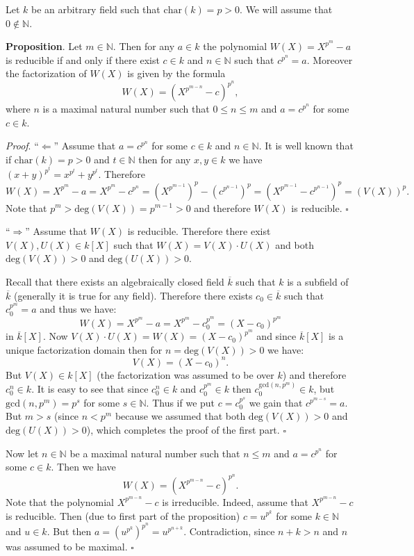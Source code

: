 \documentclass[12pt]{article}
\begin{document}
Let $k$ be an arbitrary field such that $\mathrm{char}(k) = p> 0$. We will assume that $0\not\in\mathbb{N}$.

\textbf{Proposition}. Let $m\in\mathbb{N}$. Then for any $a\in k$ the polynomial $W(X)=X^{p^{m}}-a$ is reducible if and only if there exist $c\in k$ and $n\in\mathbb{N}$ such that $c^{p^{n}}=a$. Moreover the factorization of $W(X)$ is given by the formula
$$W(X)=(X^{p^{m-n}}-c)^{p^n},$$
where $n$ is a maximal natural number such that $0\leq n\leq m$ and $a=c^{p^n}$ for some $c\in k$.

\textit{Proof}. ``$\Leftarrow$'' Assume that $a=c^{p^{n}}$ for some $c\in k$ and $n\in\mathbb{N}$. It is well known that if $\mathrm{char}(k) = p> 0$ and $t\in\mathbb{N}$ then for any $x,y\in k$ we have $(x+y)^{p^t}=x^{p^t}+y^{p^t}$. Therefore
$$W(X)=X^{p^{m}}-a=X^{p^{m}}-c^{p^{n}}=(X^{p^{m-1}})^p-(c^{p^{n-1}})^p=(X^{p^{m-1}}-c^{p^{n-1}})^p=(V(X))^p.$$
Note that $p^m > \mathrm{deg}(V(X))=p^{m-1} > 0$ and therefore $W(X)$ is reducible. $\square$

``$\Rightarrow$'' Assume that $W(X)$ is reducible. Therefore there exist $V(X),U(X)\in k[X]$ such that $W(X)=V(X)\cdot U(X)$ and both $\mathrm{deg}(V(X))>0$ and $\mathrm{deg}(U(X))>0$.

Recall that there exists an algebraically closed field $\overline{k}$ such that $k$ is a subfield of $\overline{k}$ (generally it is true for any field). Therefore there exists $c_{0}\in\overline{k}$ such that $c_{0}^{p^m}=a$ and thus we have:
$$W(X)=X^{p^{m}}-a=X^{p^{m}}-c_{0}^{p^{m}}=(X-c_{0})^{p^m}$$
in $\overline{k}[X]$. Now $V(X)\cdot U(X)=W(X)=(X-c_{0})^{p^m}$ and since $\overline{k}[X]$ is a unique factorization domain then for $n=\mathrm{deg}(V(X))>0$ we have:
$$V(X)=(X-c_{0})^n.$$
But $V(X)\in k[X]$ (the factorization was assumed to be over $k$) and therefore $c_{0}^n\in k$. It is easy to see that since $c_{0}^{n}\in k$ and $c_{0}^{p^m}\in k$ then $c_0^{\mathrm{gcd}(n,p^m)}\in k$, but $\mathrm{gcd}(n,p^m)=p^s$ for some $s\in\mathbb{N}$. Thus if we put $c=c_{0}^{p^s}$ we gain that $c^{p^{m-s}}=a$. But $m>s$ (since $n<p^m$ because we assumed that both $\mathrm{deg}(V(X))>0$ and $\mathrm{deg}(U(X))>0$), which completes the proof of the first part. $\square$

Now let $n\in\mathbb{N}$ be a maximal natural number such that $n\leq m$ and $a=c^{p^n}$ for some $c\in k$. Then we have
$$W(X)=(X^{p^{m-n}}-c)^{p^n}.$$
Note that the polynomial $X^{p^{m-n}}-c$ is irreducible. Indeed, assume that $X^{p^{m-n}}-c$ is reducible. Then (due to first part of the proposition) $c=u^{p^k}$ for some $k\in\mathbb{N}$ and $u\in k$. But then $a=(u^{p^k})^{p^n}=u^{p^{n+k}}$. Contradiction, since $n+k>n$ and $n$ was assumed to be maximal. $\square$
\end{document}
